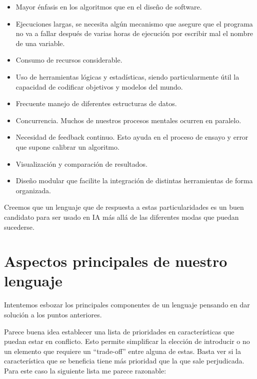 \begin{itemize}
  \item Mayor énfasis en los algoritmos que en el diseño de software.
  
  \item Ejecuciones largas, se necesita algún mecanismo que asegure que el programa no va a fallar después de varias horas de ejecución por escribir mal el nombre de una variable.
  
  \item Consumo de recursos considerable.
  
  \item Uso de herramientas lógicas y estadísticas, siendo particularmente útil la capacidad de codificar objetivos y modelos del mundo.
  
  \item Frecuente manejo de diferentes estructuras de datos.
  
  \item Concurrencia. Muchos de nuestros procesos mentales ocurren en paralelo.
  
  \item Necesidad de feedback continuo. Esto ayuda en el proceso de ensayo y error que supone calibrar un algoritmo.
  
  \item Visualización y comparación de resultados.
  
  \item Diseño modular que facilite la integración de distintas herramientas de forma organizada.
\end{itemize}


Creemos que un lenguaje que de respuesta a estas particularidades es un buen candidato para ser usado en IA más allá de las diferentes modas que puedan sucederse.


\section{Aspectos principales de nuestro lenguaje}
Intentemos esbozar los principales componentes de un lenguaje pensando en dar solución a los puntos anteriores.

Parece buena idea establecer una lista de prioridades en características que puedan estar en conflicto. Esto permite simplificar la elección de introducir o no un elemento que requiere un ``trade-off'' entre alguna de estas. Basta ver si la característica que se beneficia tiene más prioridad que la que sale perjudicada. Para este caso la siguiente lista me parece razonable:

